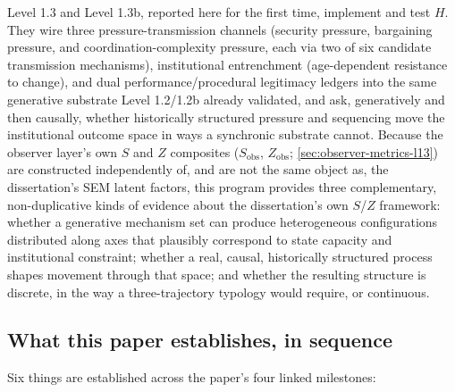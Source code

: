 Level 1.3 and Level 1.3b, reported here for the first time, implement and
test $H$. They wire three pressure-transmission channels (security
pressure, bargaining pressure, and coordination-complexity pressure, each
via two of six candidate transmission mechanisms), institutional
entrenchment (age-dependent resistance to change), and dual
performance/procedural legitimacy ledgers into the same generative
substrate Level 1.2/1.2b already validated, and ask, generatively and then
causally, whether historically structured pressure and sequencing move the
institutional outcome space in ways a synchronic substrate cannot. Because
the observer layer's own $S$ and $Z$ composites ($S_{\text{obs}}$,
$Z_{\text{obs}}$; \cref{sec:observer-metrics-l13}) are constructed
independently of, and are not the same object as, the dissertation's SEM
latent factors, this program provides three complementary, non-duplicative
kinds of evidence about the dissertation's own $S$/$Z$ framework: whether a
generative mechanism set can produce heterogeneous configurations
distributed along axes that plausibly correspond to state capacity and
institutional constraint; whether a real, causal, historically structured
process shapes movement through that space; and whether the resulting
structure is discrete, in the way a three-trajectory typology would
require, or continuous.

\subsection{What this paper establishes, in sequence}
\label{sec:intro-sequence}

Six things are established across the paper's four linked milestones:

